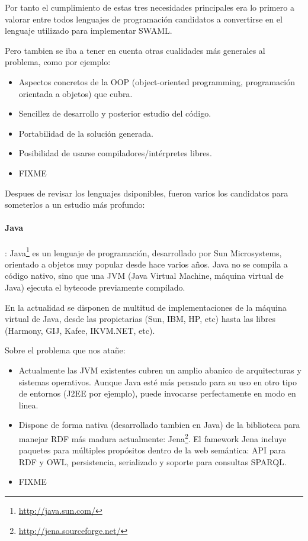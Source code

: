 Por tanto el cumplimiento de estas tres necesidades principales era lo primero
a valorar entre todos lenguajes de programación candidatos a convertirse en el
lenguaje utilizado para implementar SWAML. 

Pero tambien se iba a tener en cuenta otras cualidades más generales al problema,
como por ejemplo:

\begin{itemize}
  \item Aspectos concretos de la OOP (object-oriented programming, programación 
	orientada a objetos) que cubra.
  \item Sencillez de desarrollo y posterior estudio del código.
  \item Portabilidad de la solución generada.
  \item Posibilidad de usarse compiladores/intérpretes libres.
  \item FIXME
\end{itemize}

Despues de revisar los lenguajes dsiponibles, fueron varios los candidatos para
someterlos a un estudio más profundo:

\paragraph{Java}: Java\footnote{\url{http://java.sun.com/}}
es un lenguaje de programación, desarrollado por Sun Microsystems, orientado a 
objetos muy popular desde hace varios años. Java no se compila a código nativo, 
sino que una JVM (Java Virtual Machine, máquina virtual de Java) ejecuta el 
bytecode previamente compilado.

En la actualidad se disponen de multitud de implementaciones de la máquina virtual
de Java, desde las propietarias (Sun, IBM, HP, etc) hasta las libres (Harmony, GIJ, 
Kafee, IKVM.NET, etc).

Sobre el problema que nos atañe:

\begin{itemize}
  \item Actualmente las JVM existentes cubren un amplio abanico de arquitecturas y 
	sistemas operativos. Aunque Java esté más pensado para su uso en otro tipo
	de entornos (J2EE por ejemplo), puede invocarse perfectamente en modo en
	linea.
  \item Dispone de forma nativa (desarrollado tambien en Java) de la biblioteca para
	manejar RDF más madura actualmente: Jena\footnote{\url{http://jena.sourceforge.net/}}.
	El famework Jena incluye paquetes para múltiples propósitos dentro de la web
	semántica: API para RDF y OWL, persistencia, serializado y soporte para consultas
	SPARQL.
  \item FIXME
\end{itemize}

